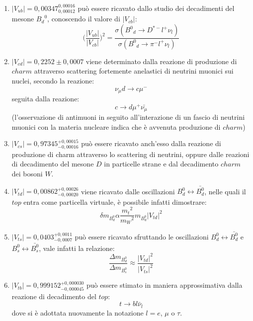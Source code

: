 \begin{enumerate}
\item $|V_{ub}| = 0,00347^{0,00016}_{0,00012}$ può essere ricavato dallo studio dei decadimenti del mesone ${B_d}^0$, conoscendo il valore di $|V_{cb}|$:
      \begin{equation}
      \bigg(\frac{|V_{ub}|}{|V_{cb}|}\bigg)^2 = \frac{\sigma({B^0}_d \rightarrow D^{*-} l^+ \nu_l)}{\sigma({B^0}_d \rightarrow \pi^{-} l^+ \nu_l)}
      \end{equation}
\item $|V_{cd}| = 0,2252 \pm 0,0007$ viene determinato dalla reazione di produzione di $charm$ attraverso scattering fortemente anelastici di neutrini muonici sui nuclei, 
      secondo la reazione:
       \begin{equation}
       \nu_{\mu} d \rightarrow c \mu^-
       \end{equation}
       seguita dalla reazione:
      \begin{equation}
       c \rightarrow d \mu^+ \bar{\nu_{\mu}}
      \end{equation}
      (l'osservazione di antimuoni in seguito all'interazione di un fascio di neutrini muonici con la materia nucleare indica che è avvenuta produzione di $charm$)
\item $|V_{cs}| = 0,97345^{+0,00015}_{-0,00016}$ può essere ricavato anch'esso dalla reazione di produzione di charm attraverso lo scattering 
       di neutrini, oppure dalle reazioni di decadimento del mesone $D$ in particelle strane e dal decadimento $charm$ dei bosoni $W$.
\item $|V_{td}| = 0,00862^{+0,00026}_{-0,00020}$ viene ricavato dalle oscillazioni $B^0_d \longleftrightarrow \bar{B^0_d}$, nelle quali il $top$ entra come particella virtuale,
      è possibile infatti dimostrare:
      \begin{equation}
       \delta m_{B^0_d} \alpha \frac{{m_t}^2}{{m_W}^2} m_{B^0_d}|V_{td}|^2
      \end{equation}
\item $|V_{ts}| = 0,0403^{+0,0011}_{-0,0007}$ può essere ricavato sfruttando le oscillazioni $B^0_d \longleftrightarrow \bar{B^0_d}$ e $B^0_s \longleftrightarrow \bar{B^0_s}$, vale infatti la relazione:
	\begin{equation}
	 \frac{\Delta m_{B^0_d}}{\Delta m_{B^0_s}} \approx \frac{|V_{td}|^2}{|V_{ts}|^2}
	\end{equation}
\item $|V_{tb}| = 0,999152^{+0,000030}_{-0,000045}$ può essere stimato in maniera approssimativa dalla reazione di decadimento del $top$:
      \begin{equation}
       t \rightarrow b l \bar{\nu}_l
      \end{equation}
      dove si è adottata nuovamente la notazione $l = e$, $\mu$ o $\tau$.
\end{enumerate}
